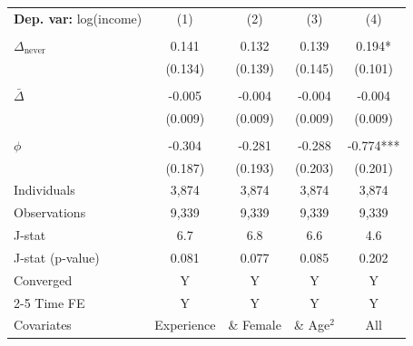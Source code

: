 \begin{tabular}{l cccc} \toprule  \textbf{Dep. var:}  log(income) 
                    &\multicolumn{1}{c}{(1)}   &\multicolumn{1}{c}{(2)}   &\multicolumn{1}{c}{(3)}   &\multicolumn{1}{c}{(4)}   \\
                    &               &               &               &               \\
\addlinespace
$\Delta_{\text{never}}$&       0.141   &       0.132   &       0.139   &       0.194*  \\
                    &     (0.134)   &     (0.139)   &     (0.145)   &     (0.101)   \\
                    &               &               &               &               \\
\addlinespace
$\bar{\Delta}$      &      -0.005   &      -0.004   &      -0.004   &      -0.004   \\
                    &     (0.009)   &     (0.009)   &     (0.009)   &     (0.009)   \\
                    &               &               &               &               \\
\addlinespace
$\phi$              &      -0.304   &      -0.281   &      -0.288   &      -0.774***\\
                    &     (0.187)   &     (0.193)   &     (0.203)   &     (0.201)   \\
\addlinespace
Individuals         &       3,874   &       3,874   &       3,874   &       3,874   \\
Observations        &       9,339   &       9,339   &       9,339   &       9,339   \\
J-stat              &         6.7   &         6.8   &         6.6   &         4.6   \\
J-stat (p-value)    &       0.081   &       0.077   &       0.085   &       0.202   \\
Converged           &           Y   &           Y   &           Y   &           Y   \\
\cmidrule{2-5} Time FE & Y & Y & Y & Y \\ Covariates & Experience & \& Female & \& Age$^2$ & All \\ \bottomrule \end{tabular}

